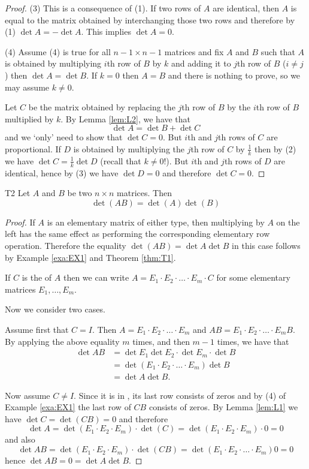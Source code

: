 \begin{proof}
(3) This is a consequence of (1). If two rows of $A$ are identical, then 
$A$ is equal to the matrix obtained by interchanging those two rows and 
therefore by (1) $\det A=-\det A$. This implies $\det A=0$. 

(4) Assume (4) is true for all $n-1\times n-1$ matrices
and fix $A$ and $B$ such that
 $A$ is obtained by multiplying $i$th row of $B$ by $k$ and adding it to 
$j$th row of $B$ ($i\neq j$) then $\det A=\det B$. 
If $k=0$ then $A=B$ and there is nothing to prove, so we may assume $k\neq 0$. 

Let $C$ be the matrix obtained by replacing the $j$th row of $B$ by the $i$th row of $B$ 
multiplied by $k$. 
By Lemma \ref{lem:L2}, we have that 
\[
\det A=\det B+\det C
\]
and we `only' need to show that $\det C=0$. But $i$th and $j$th rows of $C$
are proportional. If $D$ is obtained by multiplying the $j$th row of $C$ by $\frac 1k$
then  by (2) we have $\det C=\frac 1k\det D$ (recall that $k\neq 0$!). 
But $i$th and $j$th rows of $D$ are identical, hence by (3) we have $\det D=0$
and therefore $\det C=0$. 
\end{proof} 

\begin{theorem}{}{T2}
Let $A$ and $B$ be two $n\times n$ matrices. Then
\begin{equation*}
\det \left( AB\right) =\det \left( A\right) \det \left( B\right)
\end{equation*}
\end{theorem}

\begin{proof} If $A$ is an elementary matrix of either type, then multiplying
by $A$ on the left has the same effect as performing the corresponding elementary 
row operation. Therefore the equality $\det (AB) =\det A\det B$  in this case follows by Example \ref{exa:EX1} 
and Theorem \ref{thm:T1}. 

If $C$ is the {\rref} of $A$ then we can write $A=E_1\cdot E_2\cdot\dots\cdot E_m\cdot C$
for some elementary matrices $E_1,\dots, E_m$. 

Now we consider two cases. 

Assume first that  $C=I$. Then $A=E_1\cdot E_2\cdot \dots\cdot E_m$ 
and $AB= E_1\cdot E_2\cdot \dots\cdot E_m B$. 
    By applying the above equality $m$ times, and then $m-1$ times,   
we have that 
\begin{align*}
\det AB&=\det E_1\det E_2\cdot \det E_m\cdot \det B\\
&=\det (E_1\cdot E_2\cdot\dots\cdot E_m) \det B\\
&=\det A\det B. 
\end{align*} 

Now assume $C\neq I$. Since it is in {\rref}, its last row consists of zeros 
and by (4) of Example \ref{exa:EX1} the last row of $CB$ consists of zeros. 
By Lemma \ref{lem:L1} we have $\det C=\det (CB)=0$ and therefore 
\[
\det A=\det (E_1\cdot E_2\cdot  E_m)\cdot  \det (C)
=
\det (E_1\cdot E_2\cdot  E_m)\cdot 0=0
\]
and also 
\[
\det AB=\det (E_1\cdot E_2\cdot  E_m)\cdot  \det (C B)
=\det (E_1\cdot E_2\cdot\dots\cdot E_m) 0
=0
\]
hence $\det AB=0=\det A \det B$. 
\end{proof} 

